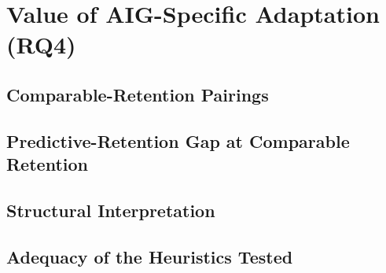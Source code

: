 \section{Value of AIG-Specific Adaptation (RQ4)}
\label{sec:results:rq4}

\subsection{Comparable-Retention Pairings}
\label{sec:results:rq4:pairings}

\subsection{Predictive-Retention Gap at Comparable Retention}
\label{sec:results:rq4:gap}

\subsection{Structural Interpretation}
\label{sec:results:rq4:interpretation}

\subsection{Adequacy of the Heuristics Tested}
\label{sec:results:rq4:adequacy}
